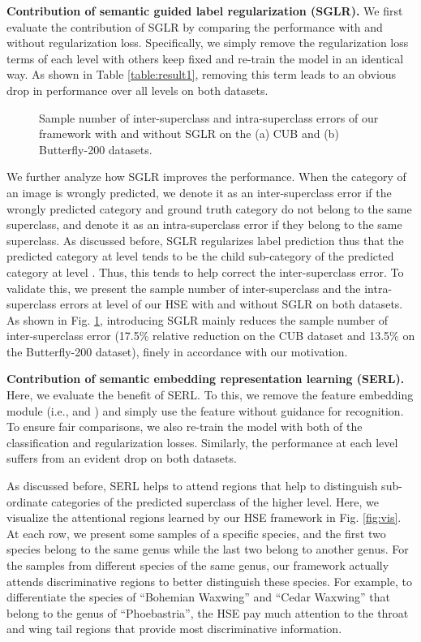 \documentclass[sigconf]{acmart}
\begin{document}
\noindent\textbf{Contribution of semantic guided label regularization (SGLR). }We first evaluate the contribution of SGLR by comparing the performance with and without regularization loss. Specifically, we simply remove the regularization loss terms of each level with others keep fixed and re-train the model in an identical way. As shown in Table \ref{table:result1}, removing this term leads to an obvious drop in performance over all levels on both datasets.

\begin{figure}[!t]
\centering
{}
\caption{Sample number of inter-superclass and intra-superclass errors of our framework with and without SGLR on the (a) CUB and (b) Butterfly-200 datasets.}
\label{fig:error}
\end{figure}

We further analyze how SGLR improves the performance. When the category of an image is wrongly predicted, we denote it as an inter-superclass error if the wrongly predicted category and ground truth category do not belong to the same superclass, and denote it as an intra-superclass error if they belong to the same superclass. As discussed before, SGLR regularizes label prediction thus that the predicted category at level  tends to be the child sub-category of the predicted category at level . Thus, this tends to help correct the inter-superclass error. To validate this, we present the sample number of inter-superclass and the intra-superclass errors at level  of our HSE with and without SGLR on both datasets. As shown in Fig. \ref{fig:error}, introducing SGLR mainly reduces the sample number of inter-superclass error (17.5\% relative reduction on the CUB dataset and 13.5\% on the Butterfly-200 dataset), finely in accordance with our motivation.

\noindent\textbf{Contribution of semantic embedding representation learning (SERL). }Here, we evaluate the benefit of SERL. To this, we remove the feature embedding module (i.e.,  and ) and simply use the feature without guidance for recognition. To ensure fair comparisons, we also re-train the model with both of the classification and regularization losses. Similarly, the performance at each level suffers from an evident drop on both datasets.

As discussed before, SERL helps to attend regions that help to distinguish sub-ordinate categories of the predicted superclass of the higher level. Here, we visualize the attentional regions learned by our HSE framework in Fig. \ref{fig:vis}. At each row, we present some samples of a specific species, and the first two species belong to the same genus while the last two belong to another genus. For the samples from different species of the same genus, our framework actually attends discriminative regions to better distinguish these species. For example, to differentiate the species of ``Bohemian Waxwing'' and ``Cedar Waxwing'' that belong to the genus of ``Phoebastria'', the HSE pay much attention to the throat and wing tail regions that provide most discriminative information.
\end{document}
